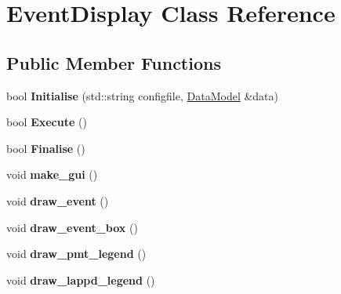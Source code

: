 \hypertarget{classEventDisplay}{
\section{EventDisplay Class Reference}
\label{classEventDisplay}
}
\subsection*{Public Member Functions}
\begin{DoxyCompactItemize}
\item 
\hypertarget{classEventDisplay_afc7edf8f24c74b37c29355745b3cc4ad}{
bool {\bfseries Initialise} (std::string configfile, \hyperlink{classDataModel}{DataModel} \&data)}
\label{classEventDisplay_afc7edf8f24c74b37c29355745b3cc4ad}

\item 
\hypertarget{classEventDisplay_a3468ff690ccecd91c2b7ee84021d5e4b}{
bool {\bfseries Execute} ()}
\label{classEventDisplay_a3468ff690ccecd91c2b7ee84021d5e4b}

\item 
\hypertarget{classEventDisplay_a0fdfbdba7f66663ca61a2015c3f87a27}{
bool {\bfseries Finalise} ()}
\label{classEventDisplay_a0fdfbdba7f66663ca61a2015c3f87a27}

\item 
\hypertarget{classEventDisplay_a0badd7d4c163fd33246ef2fb5f3f5b11}{
void {\bfseries make\_\-gui} ()}
\label{classEventDisplay_a0badd7d4c163fd33246ef2fb5f3f5b11}

\item 
\hypertarget{classEventDisplay_acdb0b7db7007c50303e29321e8b178df}{
void {\bfseries draw\_\-event} ()}
\label{classEventDisplay_acdb0b7db7007c50303e29321e8b178df}

\item 
\hypertarget{classEventDisplay_a45064b5628a451ee019e2dc47fb80268}{
void {\bfseries draw\_\-event\_\-box} ()}
\label{classEventDisplay_a45064b5628a451ee019e2dc47fb80268}

\item 
\hypertarget{classEventDisplay_a7ffd0d9f6b41b5713655e11e8d79840c}{
void {\bfseries draw\_\-pmt\_\-legend} ()}
\label{classEventDisplay_a7ffd0d9f6b41b5713655e11e8d79840c}

\item 
\hypertarget{classEventDisplay_a1405448b0dafae76a5ff4bcbb1bc2fa4}{
void {\bfseries draw\_\-lappd\_\-legend} ()}
\label{classEventDisplay_a1405448b0dafae76a5ff4bcbb1bc2fa4}


\end{DoxyCompactItemize}
